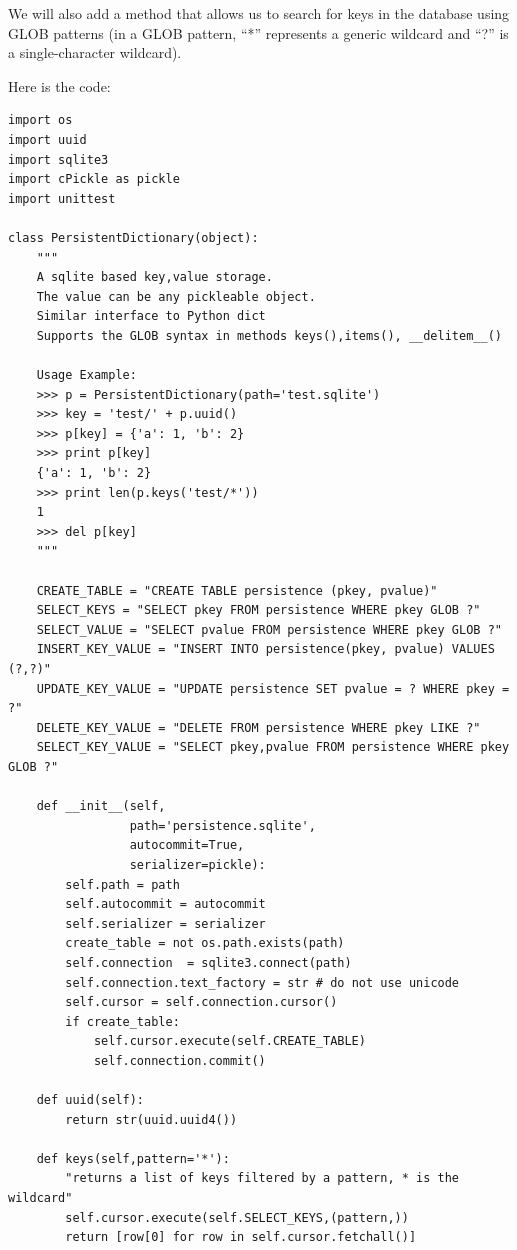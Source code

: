 \documentclass[justified,sixbynine]{tufte-book}
\def\ft{\small\tt}
\theoremstyle{plain}%
\theoremstyle{definition}
\theoremstyle{remark}
\begin{document}
\begin{fullwidth}
We will also add a method that allows us to search for keys in the database using GLOB patterns (in a GLOB pattern, ``*'' represents a generic wildcard and ``?'' is a single-character wildcard).

Here is the code:


\begin{lstlisting}[caption={in file: {\ft nlib.py}}]
import os
import uuid
import sqlite3
import cPickle as pickle
import unittest

class PersistentDictionary(object):
    """
    A sqlite based key,value storage.
    The value can be any pickleable object.
    Similar interface to Python dict
    Supports the GLOB syntax in methods keys(),items(), __delitem__()

    Usage Example:
    >>> p = PersistentDictionary(path='test.sqlite')
    >>> key = 'test/' + p.uuid()
    >>> p[key] = {'a': 1, 'b': 2}
    >>> print p[key]
    {'a': 1, 'b': 2}
    >>> print len(p.keys('test/*'))
    1
    >>> del p[key]
    """

    CREATE_TABLE = "CREATE TABLE persistence (pkey, pvalue)"
    SELECT_KEYS = "SELECT pkey FROM persistence WHERE pkey GLOB ?"
    SELECT_VALUE = "SELECT pvalue FROM persistence WHERE pkey GLOB ?"
    INSERT_KEY_VALUE = "INSERT INTO persistence(pkey, pvalue) VALUES (?,?)"
    UPDATE_KEY_VALUE = "UPDATE persistence SET pvalue = ? WHERE pkey = ?"
    DELETE_KEY_VALUE = "DELETE FROM persistence WHERE pkey LIKE ?"
    SELECT_KEY_VALUE = "SELECT pkey,pvalue FROM persistence WHERE pkey GLOB ?"

    def __init__(self,
                 path='persistence.sqlite',
                 autocommit=True,
                 serializer=pickle):
        self.path = path
        self.autocommit = autocommit
        self.serializer = serializer
        create_table = not os.path.exists(path)
        self.connection  = sqlite3.connect(path)
        self.connection.text_factory = str # do not use unicode
        self.cursor = self.connection.cursor()
        if create_table:
            self.cursor.execute(self.CREATE_TABLE)
            self.connection.commit()

    def uuid(self):
        return str(uuid.uuid4())

    def keys(self,pattern='*'):
        "returns a list of keys filtered by a pattern, * is the wildcard"
        self.cursor.execute(self.SELECT_KEYS,(pattern,))
        return [row[0] for row in self.cursor.fetchall()]


\end{lstlisting}
\end{fullwidth}
\end{document}
